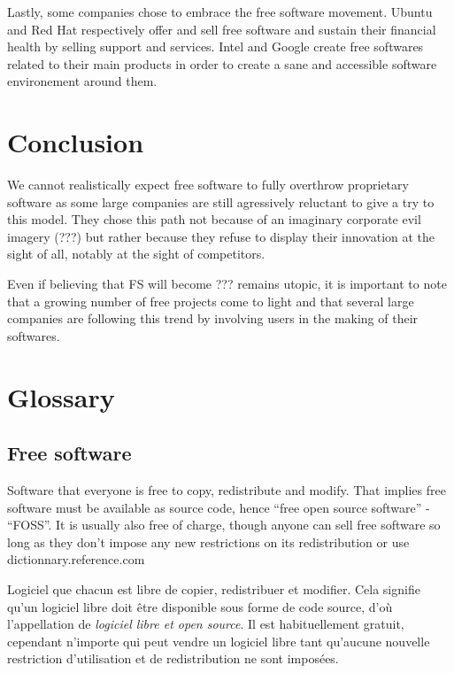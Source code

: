 \documentclass[12pt]{article}
\begin{document}
Lastly, some companies chose to embrace the free software
movement. Ubuntu and Red Hat respectively offer and sell free software
and sustain their financial health by selling support and
services. Intel and Google create free softwares related to their main
products in order to create a sane and accessible software
environement around them.

\section*{Conclusion}

We cannot realistically expect free software to fully overthrow
proprietary software as some large companies are still agressively
reluctant to give a try to this model.  They chose this path not
because of an imaginary corporate evil imagery (???) but rather
because they refuse to display their innovation at the sight of all,
notably at the sight of competitors.

Even if believing that FS will become ??? remains utopic, it is
important to note that a growing number of free projects come to light
and that several large companies are following this trend by involving
users in the making of their softwares.

\section*{Glossary}

\subsection*{Free software}

{\color{bg}Software that everyone is free to copy, redistribute and
  modify. That implies free software must be available as source code,
  hence ``free open source software'' - ``FOSS''. It is usually also free
  of charge, though anyone can sell free software so long as they
  don't impose any new restrictions on its redistribution or use
  \textemdash $\;$ dictionnary.reference.com }

Logiciel que chacun est libre de copier, redistribuer et
modifier. Cela signifie qu'un logiciel libre doit être disponible sous
forme de code source, d'o\`u l'appellation de \textit{logiciel libre
  et open source}. Il est habituellement gratuit, cependant n'importe
qui peut vendre un logiciel libre tant qu'aucune nouvelle
restriction d'utilisation et de redistribution ne sont imposées.
\end{document}
